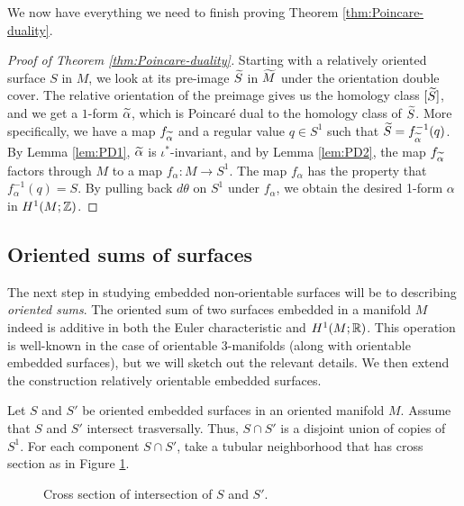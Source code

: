 We now have everything we need to finish proving Theorem \ref{thm:Poincare-duality}.
\begin{proof}[Proof of Theorem \ref{thm:Poincare-duality}]
  Starting with a relatively oriented surface $S$ in $M$, we look at its pre-image $\widetilde{S}$ in
  $\widetilde{M}$ under the orientation double cover. The relative orientation of the preimage gives us the homology class $[\widetilde{S}]$, and
  we get a $1$-form $\widetilde{\alpha}$, which is Poincar\'e dual to the homology class of $\widetilde{S}$.
  More specifically, we have a map $f_{\widetilde{\alpha}}$ and a regular value $q\in S^1$ such that $\widetilde{S}=f^{-1}_{\widetilde{\alpha}}(q)$.
  By Lemma \ref{lem:PD1}, $\widetilde{\alpha}$ is $\iota^{\ast}$-invariant, and by Lemma \ref{lem:PD2}, the map $f_{\widetilde{\alpha}}$ factors through $M$ to a map $f_{\alpha}:M\to S^1$.  The map $f_\alpha$ has the property that $f_{\alpha}^{-1}(q) =
  S$. By pulling back $d\theta$ on $S^1$ under $f_\alpha$, we obtain the desired 1-form $\alpha$ in $H^1(M; \mathbb{Z})$.
\end{proof}

\subsection{Oriented sums of surfaces}
\label{sec:orient-sums-surf}

The next step in studying embedded non-orientable surfaces will be to describing
\emph{oriented sums}.  The oriented sum of two surfaces embedded in a manifold $M$ indeed is additive in both the Euler characteristic and $H^1(M;\mathbb{R})$. This
operation is well-known in the case of orientable $3$-manifolds (along with orientable embedded
surfaces), but we will sketch out the relevant details.  We then extend the construction relatively orientable embedded surfaces. %

Let $S$ and $S'$ be oriented embedded surfaces in an oriented manifold $M$. Assume that $S$ and $S'$ intersect
trasversally. Thus, $S \cap S'$ is a disjoint union of copies of $S^1$. For each component $S\cap S'$, take a tubular neighborhood that has cross section as in Figure \ref{fig:cross-section}.

\begin{figure}
  \centering
  \caption{Cross section of intersection of $S$ and $S'$.}
  \label{fig:cross-section}
\end{figure}


